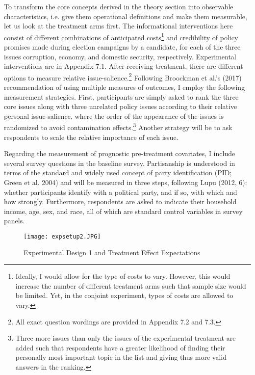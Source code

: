 \documentclass[11pt]{article}
\begin{document}
To transform the core concepts derived in the theory section into observable characteristics, i.e. give them operational definitions and make them measurable, let us look at the treatment arms first. The informational interventions here consist of different combinations of anticipated costs\footnote{Ideally, I would allow for the type of costs to vary. However, this would increase the number of different treatment arms such that sample size would be limited. Yet, in the conjoint experiment, types of costs are allowed to vary.} and credibility of policy promises made during election campaigns by a candidate, for each of the three issues corruption, economy, and domestic security, respectively. Experimental interventions are in Appendix 7.1. After receiving treatment, there are different options to measure relative issue-salience.\footnote{All exact question wordings are provided in Appendix 7.2 and 7.3.} Following Broockman et al.'s (2017) recommendation of using multiple measures of outcomes, I employ the following measurement strategies. First, participants are simply asked to rank the three core issues along with three unrelated policy issues according to their relative personal issue-salience, where the order of the appearance of the issues is randomized to avoid contamination effects.\footnote{Three more issues than only the issues of the experimental treatment are added such that respondents have a greater likelihood of finding their personally most important topic in the list and giving thus more valid answers in the ranking.} Another strategy will be to ask respondents to scale the relative importance of each issue.

Regarding the measurement of prognostic pre-treatment covariates, I include several survey questions in the baseline survey. Partisanship is understood in terms of the standard and widely used concept of party identification (PID; Green et al. 2004) and will be measured in three steps, following Lupu (2012, 6): whether participants identify with a political party, and if so, with which and how strongly. Furthermore, respondents are asked to indicate their household income, age, sex, and race, all of which are standard control variables in survey panels.

\begin{figure}[H]
\centering
\texttt{[image: expsetup2.JPG]}
\caption{Experimental Design 1 and Treatment Effect Expectations}
\label{fig:fig2}
\end{figure}
\end{document}
